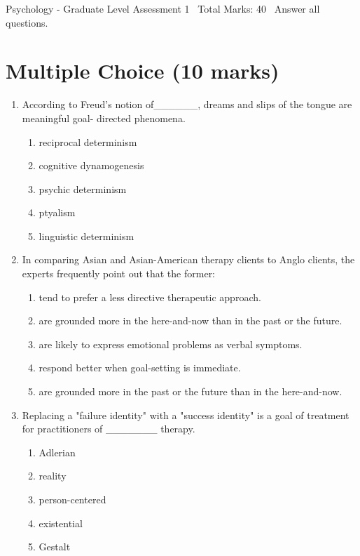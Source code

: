 \documentclass[12pt]{article}
\begin{document}
\begin{center}
Psychology - Graduate Level Assessment 1 \
Total Marks: 40 \
Answer all questions.
\end{center}

\section*{Multiple Choice (10 marks)}
\begin{enumerate}[label=\arabic*.]
\item According to Freud's notion of\_\_\_\_\_\_, dreams and slips of the tongue are meaningful goal- directed phenomena.
\begin{enumerate}[label=(\alph*)]
    \item reciprocal determinism
    \item cognitive dynamogenesis
    \item psychic determinism
    \item ptyalism
    \item linguistic determinism
\end{enumerate}
\item In comparing Asian and Asian-American therapy clients to Anglo clients, the experts frequently point out that the former:
\begin{enumerate}[label=(\alph*)]
    \item tend to prefer a less directive therapeutic approach.
    \item are grounded more in the here-and-now than in the past or the future.
    \item are likely to express emotional problems as verbal symptoms.
    \item respond better when goal-setting is immediate.
    \item are grounded more in the past or the future than in the here-and-now.
\end{enumerate}
\item Replacing a "failure identity" with a "success identity" is a goal of treatment for practitioners of \_\_\_\_\_\_\_ therapy.
\begin{enumerate}[label=(\alph*)]
    \item Adlerian
    \item reality
    \item person-centered
    \item existential
    \item Gestalt
\end{enumerate}

\end{enumerate}
\end{document}
